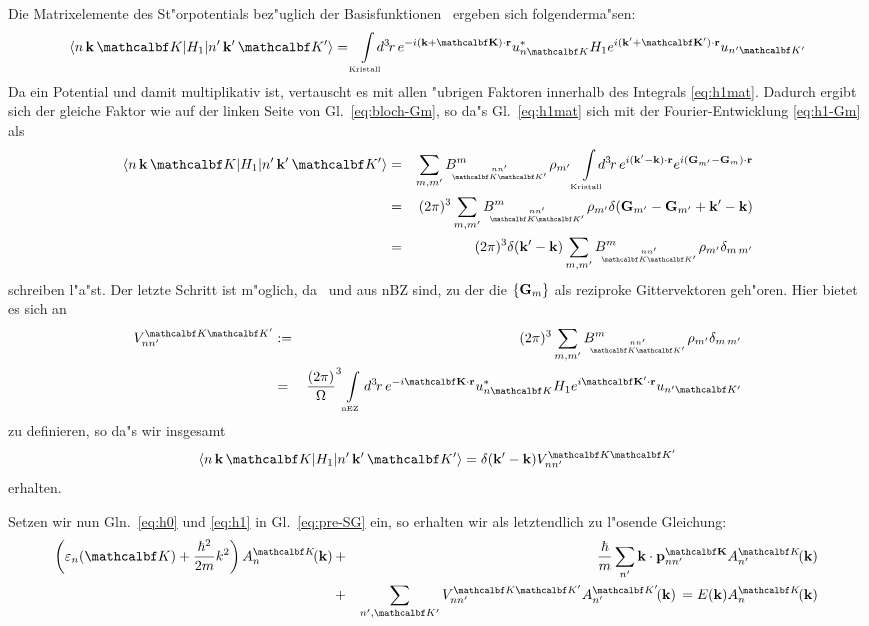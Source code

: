 Die Matrixelemente des St"orpotentials  bez"uglich der
Basisfunktionen \basis\ ergeben sich folgenderma"sen:
%
\begin{equation}
  \label{eq:h1mat}
  \matrixel{\varbasis}{\op{H_{1}}}{\pvarbasis} = 
  \bzint{Kristall}\!\!\!\! \vdx{r} e^{-i\sprod{(\nk+\set)}{r}}
  \cc{u_{n\set}} \op{H_{1}} e^{i\sprod{(\pri{\nk}+\pri{\set})}{r}}
  u_{\pri{n}\pri{\set}}
\end{equation}
%
Da  ein Potential und damit multiplikativ ist, vertauscht es mit
allen "ubrigen Faktoren innerhalb des Integrals \eqref{eq:h1mat}. Dadurch
ergibt sich der 
gleiche Faktor wie auf der linken Seite von Gl.~\eqref{eq:bloch-Gm}, so da"s
Gl.~\eqref{eq:h1mat} sich mit der Fourier-Entwicklung \eqref{eq:h1-Gm} als
%
\begin{eqnarray*}
  \matrixel{\varbasis}{\op{H_{1}}}{\pvarbasis} 
  &=&  \sum_{m,\pri{m}} \BnnKK{m} \rho_{\pri{m}} 
  \bzint{Kristall}\!\!\!\! \vdx{r} e^{i\sprod{(\pri{\nk}-\nk)}{r}}
  e^{i\sprod{(\pnG-\nG)}{r}} \nonumber \\
  &=& (2\pi)^{3} \sum_{m,\pri{m}} \BnnKK{m} \rho_{\pri{m}} 
  \delta(\pnG - \pnG + \pri{\nk} - \nk) \nonumber \\
  &=& (2\pi)^{3}  \delta(\pri{\nk} - \nk) 
  \sum_{m,\pri{m}} \BnnKK{m} \rho_{\pri{m}} \kronecker{m}{\pri{m}}
\end{eqnarray*}
%
schreiben l"a"st. Der letzte Schritt ist m"oglich, da \nk\ und
\pri{\nk} aus nBZ sind, zu der die $\{\mathbf{G}_{\mathnormal{m}}\}$ als reziproke
Gittervektoren geh"oren.
Hier bietet es sich an
%
\begin{eqnarray}
  \label{eq:VnnKK}
  \VnnKK &:=&  (2\pi)^{3} \sum_{m,\pri{m}} \BnnKK{m} \rho_{\pri{m}}
  \kronecker{m}{\pri{m}} \nonumber \\
  &=& {\frac{(2\pi)}{\Omega}}^{3} \bzint{nEZ} \vdx{r}
  e^{-i\sprod{\set}{r}} \cc{u_{n\set}} \op{H_{1}}  
  e^{i\sprod{\pri{\set}}{r}} u_{\pri{n}\pri{\set}}
\end{eqnarray}
%
zu definieren, so da"s wir insgesamt
%
\begin{equation}
  \label{eq:h1}
  \matrixel{\varbasis}{\op{H_{1}}}{\pvarbasis} = 
  \delta(\pri{\nk}-\nk) \VnnKK
\end{equation}
%
erhalten.

Setzen wir nun Gln.~\eqref{eq:h0} und \eqref{eq:h1} in Gl.~\eqref{eq:pre-SG}
ein, so erhalten wir als letztendlich zu l"osende Gleichung:
%
\begin{eqnarray}
  \label{eq:SG}
  \left( \veps_{n}(\set) + \frac{\hbar^{2}}{2m} \nkb^{2} \right) \koeff &+& 
  \frac{\hbar}{m} \sum_{\pri{n}} \sprod{\nk}{\pnnK} A^{\set}_{\pri{n}} \!
  (\nk) \,  \nonumber \\
  &+& \sum_{\pri{n},\pri{\set}}  \VnnKK A^{\pri{\set}}_{\pri{n}} \!
  (\nk) \,  = E(\nk) \koeff
\end{eqnarray}
%

